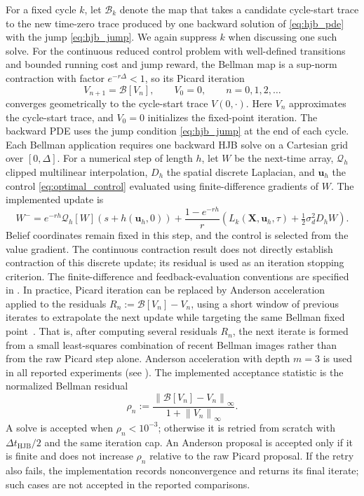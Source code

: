 \documentclass{article}
\newcommand{\norm}[1]{\left\|#1\right\|}
\renewcommand{\u}{\mathbf{u}}
\newcommand{\bX}{\mathbf{X}}
\begin{document}
For a fixed cycle $k$, let $\mathcal B_k$ denote the map that takes a candidate cycle-start trace to the new time-zero trace produced by one backward solution of \eqref{eq:hjb_pde} with the jump \eqref{eq:hjb_jump}.
We again suppress $k$ when discussing one such solve.
For the continuous reduced control problem with well-defined transitions and bounded running cost and jump reward, the Bellman map is a sup-norm contraction with factor $e^{-r\Delta}<1$, so its Picard iteration
\begin{equation}
\label{eq:picard}
V_{n+1} = \mathcal B[V_n],\qquad V_0=0,\qquad n=0,1,2,\ldots
\end{equation}
converges geometrically to the cycle-start trace $V(0,\cdot)$.
Here $V_n$ approximates the cycle-start trace, and $V_0=0$ initializes the fixed-point iteration.
The backward PDE uses the jump condition \eqref{eq:hjb_jump} at the end of each cycle.
Each Bellman application requires one backward HJB solve on a Cartesian grid over $[0,\Delta]$.
For a numerical step of length $h$, let $W$ be the next-time array, $\mathcal Q_h$ clipped multilinear interpolation, $D_h$ the spatial discrete Laplacian, and $\u_h$ the control \eqref{eq:optimal_control} evaluated using finite-difference gradients of $W$.
The implemented update is
\begin{equation}
\label{eq:discrete_hjb_update}
W^- = e^{-rh}\mathcal Q_h[W](s+h(\u_h,0))
+\frac{1-e^{-rh}}{r}\left(L_k(\bX,\u_h,\tau)+\tfrac12\sigma_d^2D_hW\right).
\end{equation}
Belief coordinates remain fixed in this step, and the control is selected from the value gradient.
The continuous contraction result does not directly establish contraction of this discrete update; its residual is used as an iteration stopping criterion.
The finite-difference and feedback-evaluation conventions are specified in .
In practice, Picard iteration can be replaced by Anderson acceleration applied to the residuals $R_n:=\mathcal B[V_n]-V_n$, using a short window of previous iterates to extrapolate the next update while targeting the same Bellman fixed point~\cite{anderson1965iterative}.
That is, after computing several residuals $R_n$, the next iterate is formed from a small least-squares combination of recent Bellman images rather than from the raw Picard step alone.
Anderson acceleration with depth $m=3$ is used in all reported experiments (see ).
The implemented acceptance statistic is the normalized Bellman residual
\begin{equation}
\label{eq:normalized_bellman_residual}
\rho_n:=\frac{\norm{\mathcal B[V_n]-V_n}_\infty}{1+\norm{V_n}_\infty}.
\end{equation}
A solve is accepted when $\rho_n<10^{-3}$; otherwise it is retried from scratch with $\Delta t_{\mathrm{HJB}}/2$ and the same iteration cap.
An Anderson proposal is accepted only if it is finite and does not increase $\rho_n$ relative to the raw Picard proposal.
If the retry also fails, the implementation records nonconvergence and returns its final iterate; such cases are not accepted in the reported comparisons.
\end{document}
